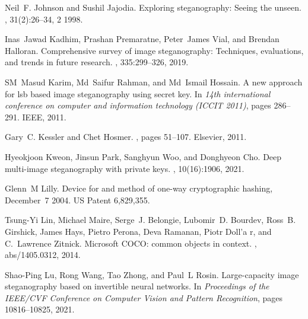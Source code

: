 \documentclass{article}
\begin{document}
\begin{thebibliography}{}
	Neil~F. Johnson and Sushil Jajodia.
	\newblock Exploring steganography: Seeing the unseen.
	, 31(2):26--34, 2 1998.
	
	Inas~Jawad Kadhim, Prashan Premaratne, Peter~James Vial, and Brendan Halloran.
	\newblock Comprehensive survey of image steganography: Techniques, evaluations,
	and trends in future research.
	, 335:299--326, 2019.
	
	SM~Masud Karim, Md~Saifur Rahman, and Md~Ismail Hossain.
	\newblock A new approach for lsb based image steganography using secret key.
	\newblock In {\em 14th international conference on computer and information
		technology (ICCIT 2011)}, pages 286--291. IEEE, 2011.
	
	Gary~C. Kessler and Chet Hosmer.
	, pages 51--107.
	\newblock Elsevier, 2011.
	
	Hyeokjoon Kweon, Jinsun Park, Sanghyun Woo, and Donghyeon Cho.
	\newblock Deep multi-image steganography with private keys.
	, 10(16):1906, 2021.
	
	Glenn~M Lilly.
	\newblock Device for and method of one-way cryptographic hashing, December~7
	2004.
	\newblock US Patent 6,829,355.
	
	Tsung{-}Yi Lin, Michael Maire, Serge~J. Belongie, Lubomir~D. Bourdev, Ross~B.
	Girshick, James Hays, Pietro Perona, Deva Ramanan, Piotr Doll{'{a} }r, and
	C.~Lawrence Zitnick.
	\newblock Microsoft {COCO:} common objects in context.
	, abs/1405.0312, 2014.
	
	Shao-Ping Lu, Rong Wang, Tao Zhong, and Paul~L Rosin.
	\newblock Large-capacity image steganography based on invertible neural
	networks.
	\newblock In {\em Proceedings of the IEEE/CVF Conference on Computer Vision and
		Pattern Recognition}, pages 10816--10825, 2021.
	

\end{thebibliography}
\end{document}
